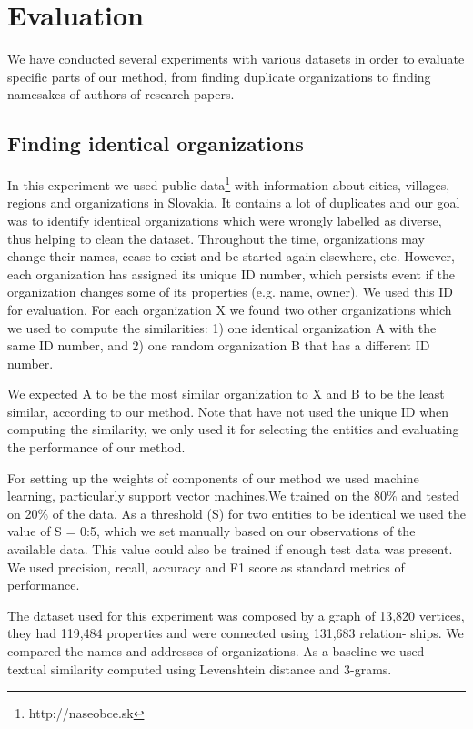 \documentclass{llncs}
\begin{document}
\section{Evaluation}
We have conducted several experiments with various datasets in order to evaluate
specific parts of our method, from finding duplicate organizations to finding
namesakes of authors of research papers.

\subsection {Finding identical organizations}
In this experiment we used public data\footnote{http://naseobce.sk} with information about cities, villages,
regions and organizations in Slovakia. It contains a lot of duplicates and our goal
was to identify identical organizations which were wrongly labelled as diverse,
thus helping to clean the dataset.
Throughout the time, organizations may change their names, cease to exist
and be started again elsewhere, etc. However, each organization has assigned
its unique ID number, which persists event if the organization changes some
of its properties (e.g. name, owner). We used this ID for evaluation. For each
organization X we found two other organizations which we used to compute the
similarities: 1) one identical organization A with the same ID number, and 2)
one random organization B that has a different ID number.

We expected A to be the most similar organization to X and B to be the
least similar, according to our method. Note that have not used the unique ID
when computing the similarity, we only used it for selecting the entities and
evaluating the performance of our method.

For setting up the weights of components of our method we used machine
learning, particularly support vector machines.We trained on the 80\% and tested
on 20\% of the data. As a threshold (S) for two entities to be identical we used the
value of S = 0:5, which we set manually based on our observations of the available
data. This value could also be trained if enough test data was present. We used
precision, recall, accuracy and F1 score as standard metrics of performance.

The dataset used for this experiment was composed by a graph of 13,820
vertices, they had 119,484 properties and were connected using 131,683 relation-
ships. We compared the names and addresses of organizations. As a baseline we
used textual similarity computed using Levenshtein distance and 3-grams.
\end{document}
